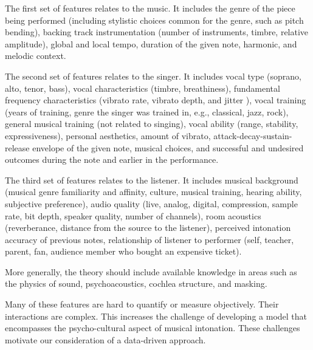The first set of features relates to the music. It includes the genre of the piece being performed (including stylistic choices common for the genre, such as pitch bending), backing track instrumentation (number of instruments, timbre, relative amplitude), global and local tempo, duration of the given note, harmonic, and melodic context.

The second set of features relates to the singer. It includes vocal type (soprano, alto, tenor, bass), vocal characteristics (timbre, breathiness), fundamental frequency characteristics (vibrato rate, vibrato depth, and jitter \cite{devaney2020new}), vocal training (years of training, genre the singer was trained in, e.g., classical, jazz, rock), general musical training (not related to singing), vocal ability (range, stability, expressiveness), personal aesthetics, amount of vibrato, attack-decay-sustain-release envelope of the given note, musical choices, and successful and undesired outcomes during the note and earlier in the performance.

The third set of features relates to the listener. It includes musical background (musical genre familiarity and affinity, culture, musical training, hearing ability, subjective preference), audio quality (live, analog, digital, compression, sample rate, bit depth, speaker quality, number of channels), room acoustics (reverberance, distance from the source to the listener), perceived intonation accuracy of previous notes, relationship of listener to performer (self, teacher, parent, fan, audience member who bought an expensive ticket).

More generally, the theory should include available knowledge in areas such as the physics of sound, psychoacoustics, cochlea structure, and masking.

Many of these features are hard to quantify or measure objectively. Their interactions are complex. This increases the challenge of developing a model that encompasses the psycho-cultural aspect of musical intonation. These challenges motivate our consideration of a data-driven approach.

